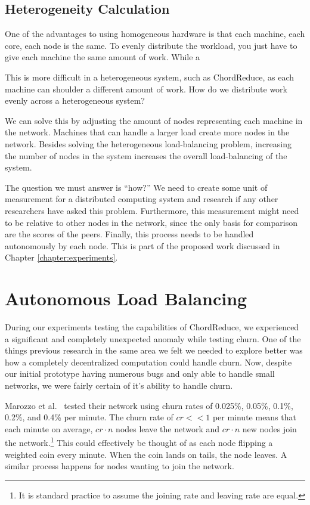 \subsection{Heterogeneity Calculation}

One of the advantages to using homogeneous hardware is that each machine, each core, each node is the same.
To evenly distribute the workload, you just have to give each machine the same amount of work.
While a

This is more difficult in a heterogeneous system, such as ChordReduce, as each machine can shoulder a different amount of work.
How do we distribute work evenly across a heterogeneous system?

We can solve this by adjusting the amount of nodes representing each machine in the network.
Machines that can handle a larger load create more nodes in the network.
Besides solving the heterogeneous load-balancing problem, increasing the number of nodes in the system increases the overall load-balancing of the system.

The question we must answer is ``how?''
We need to create some unit of measurement for a distributed computing system and research if any other researchers have asked this problem.
Furthermore, this measurement might need to be relative to other nodes in the network, since the only basis for comparison are the scores of the peers. 
Finally, this process needs to be handled autonomously by each node.
This is part of the proposed work discussed in Chapter \ref{chapter:experiments}.
\section{Autonomous Load Balancing}
\label{sec:auto-load-bal}


During our experiments testing the capabilities of ChordReduce, we experienced a significant and completely unexpected anomaly while testing churn.
One of the things previous research \cite{marozzo2012p2p}  \cite{leemap} in the same area we felt we needed to explore better was how a completely decentralized computation could handle churn.
Now, despite our initial prototype having numerous bugs and only able to handle small networks, we were fairly certain of it's ability to handle churn.

Marozzo et al.\ \cite{marozzo2012p2p} tested their network using churn rates of 0.025\%, 0.05\%, 0.1\%, 0.2\%, and 0.4\% per minute.
The churn rate of $cr << 1$ per minute means that each minute on average, $cr \cdot n$ nodes leave the network and $cr \cdot n$  new nodes join the network.\footnote{It is standard practice to assume the joining rate and leaving rate are equal.}
This could effectively be thought of as each node flipping a weighted coin every minute.
When the coin lands on tails, the node leaves.
A similar process happens for nodes wanting to join the network.

